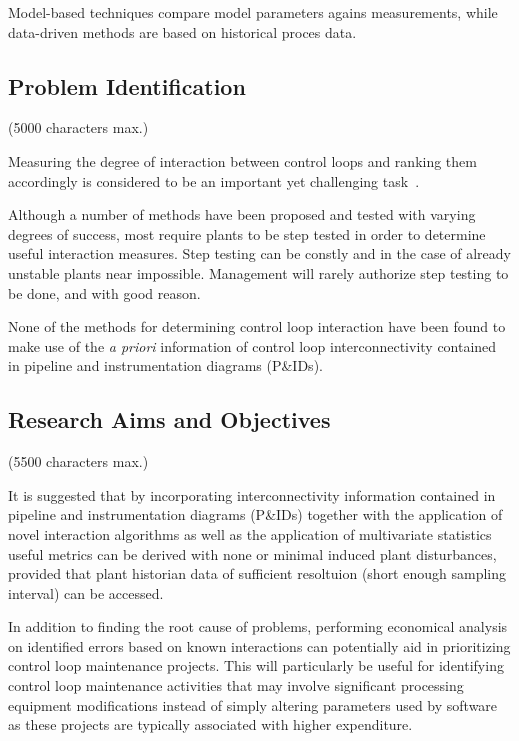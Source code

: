 \documentclass[a4paper]{book}
\begin{document}
Model-based techniques compare model parameters agains measurements, while data-driven methods are based on historical proces data.


\subsection{Problem Identification}
(5000 characters max.)

Measuring the degree of interaction between control loops and ranking them accordingly is considered to be an important yet challenging task~\cite{Rahman2011}.

Although a  number of methods have been proposed and tested with varying degrees of success, most require plants to be step tested in order to determine useful interaction measures.
Step testing can be constly and in the case of already unstable plants near impossible.
Management will rarely authorize step testing to be done, and with good reason.

None of the methods for determining control loop interaction have been found to make use of the \textit{a priori} information of control loop interconnectivity contained in pipeline and instrumentation diagrams (P\&IDs). %


\subsection{Research Aims and Objectives}
(5500 characters max.)

It is suggested that by incorporating interconnectivity information contained in pipeline and instrumentation diagrams (P\&IDs) together with the application of novel interaction algorithms as well as the application of multivariate statistics useful metrics can be derived with none or minimal induced plant disturbances, provided that plant historian data of sufficient resoltuion (short enough sampling interval) can be accessed.

In addition to finding the root cause of problems, performing economical analysis on identified errors based on known interactions can potentially aid in prioritizing control loop maintenance projects.
This will particularly be useful for identifying control loop maintenance activities that may involve significant processing equipment modifications instead of simply altering parameters used by software as these projects are typically associated with higher expenditure.
\end{document}

